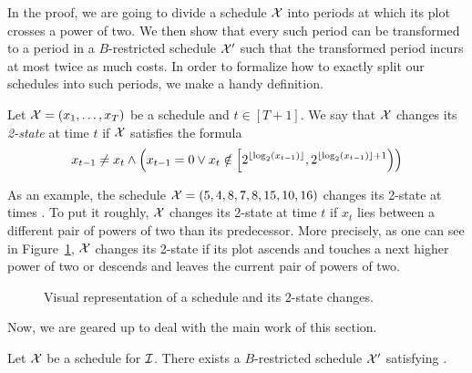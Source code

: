 In the proof, we are going to divide a schedule $\mathcal{X}$ into periods at which its plot crosses a power of two. We then show that every such period can be transformed to a period in a $B$-restricted schedule $\mathcal{X}'$ such that the transformed period incurs at most twice as much costs. In order to formalize how to exactly split our schedules into such periods, we make a handy definition.
\begin{defn}
Let $\mathcal{X}=(x_1,\dotsc,x_T)$ be a schedule and $t\in[T+1]$. We say that $\mathcal{X}$ changes its \emph{2-state} at time $t$ if $\mathcal{X}$ satisfies the formula
\begin{equation*}
	x_{t-1}\neq x_t\land \left(x_{t-1}=0 \lor x_t\notin\left[2^{\lfloor\log_2(x_{t-1})\rfloor},2^{\lfloor\log_2(x_{t-1})\rfloor+1}\right)\right)
\end{equation*}
\end{defn}
As an example, the schedule $\mathcal{X}=(5,4,8,7,8,15,10,16)$ changes its 2-state at times . To put it roughly, $\mathcal{X}$ changes its 2-state at time $t$ if $x_t$ lies between a different pair of powers of two than its predecessor. More precisely, as one can see in Figure~\ref{fig:schedule_2_states}, $\mathcal{X}$ changes its 2-state if its plot ascends and touches a next higher power of two or descends and leaves the current pair of powers of two.
\begin{figure}[H]
\centering

\caption{Visual representation of a schedule and its 2-state changes.}
\label{fig:schedule_2_states}
\end{figure}
Now, we are geared up to deal with the main work of this section.
\begin{lem}\label{lem:transform_schedule_approx_2}
Let $\mathcal{X}$ be a schedule for $\mathcal{I}$. There exists a $B$-restricted schedule $\mathcal{X}'$ satisfying .
\end{lem}
